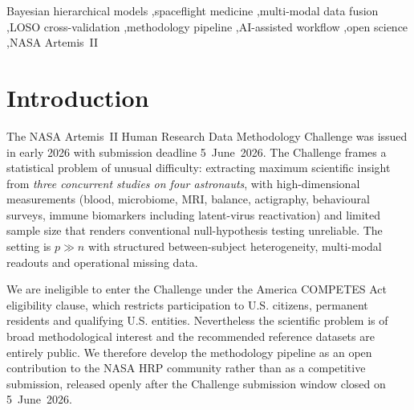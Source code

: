 \documentclass[11pt,a4paper,3p,authoryear]{elsarticle}
\begin{document}
\begin{frontmatter}
\begin{keyword}
Bayesian hierarchical models \sep spaceflight medicine \sep multi-modal data fusion \sep LOSO cross-validation \sep methodology pipeline \sep AI-assisted workflow \sep open science \sep NASA Artemis~II
\end{keyword}

\end{frontmatter}

\section{Introduction}

The NASA Artemis~II Human Research Data Methodology Challenge \citep{NASAhrp2026} was issued in early 2026 with submission deadline 5~June~2026. The Challenge frames a statistical problem of unusual difficulty: extracting maximum scientific insight from \emph{three concurrent studies on four astronauts}, with high-dimensional measurements (blood, microbiome, MRI, balance, actigraphy, behavioural surveys, immune biomarkers including latent-virus reactivation) and limited sample size that renders conventional null-hypothesis testing unreliable. The setting is $p \gg n$ with structured between-subject heterogeneity, multi-modal readouts and operational missing data.

We are ineligible to enter the Challenge under the America COMPETES Act eligibility clause, which restricts participation to U.S. citizens, permanent residents and qualifying U.S. entities. Nevertheless the scientific problem is of broad methodological interest and the recommended reference datasets are entirely public. We therefore develop the methodology pipeline as an open contribution to the NASA HRP community rather than as a competitive submission, released openly after the Challenge submission window closed on \mbox{5~June~2026}.
\end{document}
